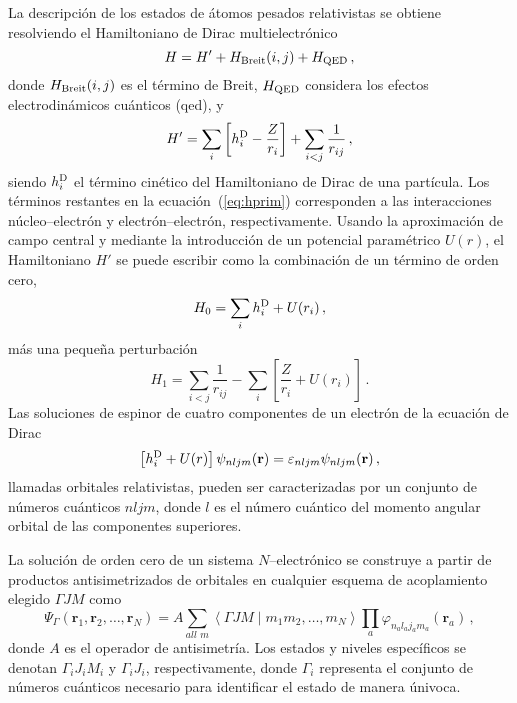 La descripción de los estados de átomos pesados relativistas se 
obtiene resolviendo el Hamiltoniano de Dirac multielectrónico
\begin{equation}
 H = H' + H_{\mathrm{\mbox{\scriptsize Breit}}}(i,j) +
 H_{\mbox{\scriptsize QED}}\,,
\label{eq:htot}
\end{equation}
donde $H_{\mathrm{\mbox{\scriptsize Breit}}}(i,j)$ es el término de 
Breit, $H_{\mbox{\scriptsize QED}}$ considera los efectos 
electrodinámicos cuánticos (\acs{qed}), y
\begin{equation}
 H' = \sum_i \left[ h_i^{\mbox{\scriptsize D}} - \frac{Z}{r_i}\right]
 + \sum_{i<j}\frac{1}{r_{ij}}\,,
\label{eq:hprim}
\end{equation}
siendo $h_i^{\mbox{\scriptsize D}}$ el término cinético del 
Hamiltoniano de Dirac de una partícula. Los términos restantes en la
ecuación~(\ref{eq:hprim}) corresponden a las interacciones 
núcleo--electrón y electrón--electrón, respectivamente. Usando la 
aproximación de campo central y mediante la introducción de un potencial 
paramétrico $U(r)$, el Hamiltoniano $H'$ se puede escribir como la 
combinación de un término de orden cero, 
\begin{equation}
 H_0 = \sum_i h_i^{\mbox{\scriptsize D}} + U(r_i)\,,
\end{equation}
más una pequeña perturbación
\begin{equation}
 H_1 = \sum_{i<j}\frac{1}{r_{ij}}
 - \sum_i \left[ \frac{Z}{r_i} + U(r_i) \right]\,.
\end{equation}
Las soluciones de espinor de cuatro componentes de un electrón de la 
ecuación de Dirac
\begin{equation}
\left[ h_i^{\mbox{\scriptsize D}} +U(r) \right] \psi_{nljm}(\mathbf{r}) 
= \varepsilon_{nljm} \psi_{nljm}(\mathbf{r})\,,
\label{eq:ecuacionDirac}
\end{equation}
llamadas orbitales relativistas, pueden ser caracterizadas por un 
conjunto de números cuánticos $nljm$, donde $l$ es el número cuántico 
del momento angular orbital de las componentes superiores. 

La solución de orden cero de un sistema $N$--electrónico se construye a 
partir de productos antisimetrizados de orbitales en cualquier esquema 
de acoplamiento elegido $\Gamma JM$ como
\begin{equation}
\Psi_{\Gamma}\left(\mathbf{r}_1, \mathbf{r}_2, \ldots, \mathbf{r}_N\right)=A \sum_{all\,\,m}\left\langle\Gamma J M \mid m_1 m_2, \ldots, m_{N}\right\rangle \prod_{a} \varphi_{n_a l_a j_a m_a}\left(\mathbf{r}_a\right)\,,
\end{equation}
donde $A$ es el operador de antisimetría. Los estados y niveles 
específicos se denotan $\Gamma_iJ_iM_i$ y $\Gamma_iJ_i$, respectivamente,
donde $\Gamma_i$ representa el conjunto de números cuánticos necesario 
para identificar el estado de manera únivoca. 


